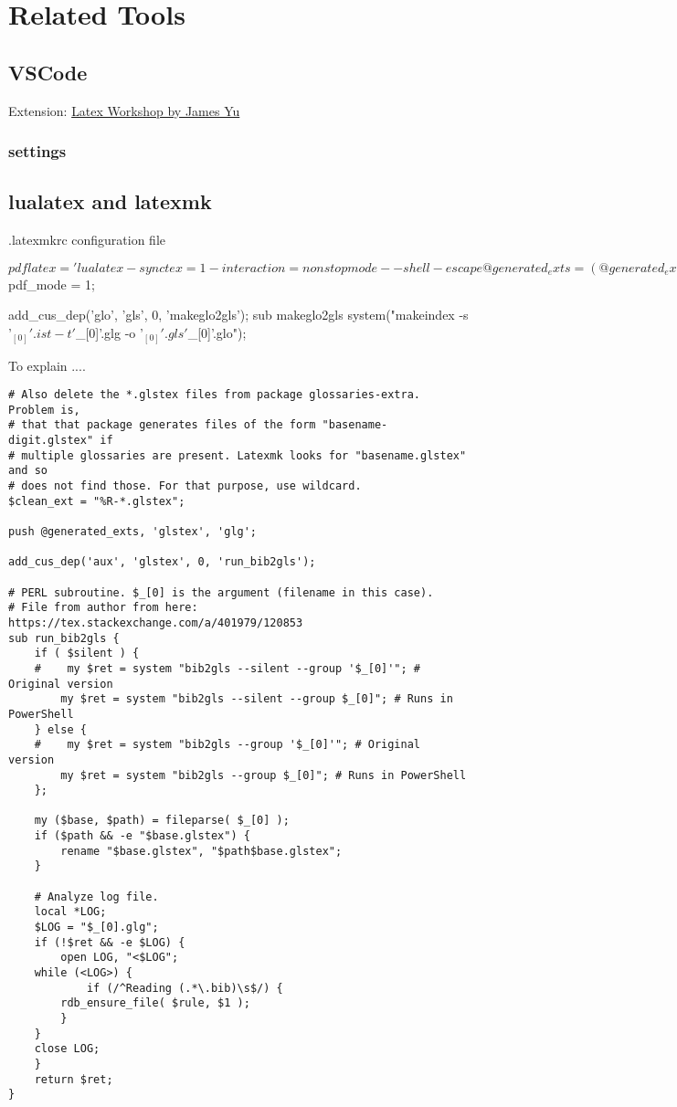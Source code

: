 \section{Related Tools}
\subsection{VSCode}
Extension: \href{https://marketplace.visualstudio.com/items?itemName=James-Yu.latex-workshop}{Latex Workshop by James Yu}

\subsubsection{settings}

\subsection{lualatex and latexmk}
.latexmkrc configuration file
\begin{verbatim*}
	$pdflatex = 'lualatex -synctex=1 -interaction=nonstopmode --shell-escape %O %S';
	@generated_exts = (@generated_exts, 'synctex.gz');
	$pdf_mode = 1;

	add_cus_dep('glo', 'gls', 0, 'makeglo2gls');
	sub makeglo2gls {
		system("makeindex -s '$_[0]'.ist -t '$_[0]'.glg -o '$_[0]'.gls '$_[0]'.glo");
	}
\end{verbatim*}
To explain ....
\begin{verbatim}
# Also delete the *.glstex files from package glossaries-extra. Problem is,
# that that package generates files of the form "basename-digit.glstex" if
# multiple glossaries are present. Latexmk looks for "basename.glstex" and so
# does not find those. For that purpose, use wildcard.
$clean_ext = "%R-*.glstex";

push @generated_exts, 'glstex', 'glg';

add_cus_dep('aux', 'glstex', 0, 'run_bib2gls');

# PERL subroutine. $_[0] is the argument (filename in this case).
# File from author from here: https://tex.stackexchange.com/a/401979/120853
sub run_bib2gls {
    if ( $silent ) {
    #    my $ret = system "bib2gls --silent --group '$_[0]'"; # Original version
        my $ret = system "bib2gls --silent --group $_[0]"; # Runs in PowerShell
    } else {
    #    my $ret = system "bib2gls --group '$_[0]'"; # Original version
        my $ret = system "bib2gls --group $_[0]"; # Runs in PowerShell
    };

    my ($base, $path) = fileparse( $_[0] );
    if ($path && -e "$base.glstex") {
        rename "$base.glstex", "$path$base.glstex";
    }

    # Analyze log file.
    local *LOG;
    $LOG = "$_[0].glg";
    if (!$ret && -e $LOG) {
        open LOG, "<$LOG";
    while (<LOG>) {
            if (/^Reading (.*\.bib)\s$/) {
        rdb_ensure_file( $rule, $1 );
        }
    }
    close LOG;
    }
    return $ret;
}
\end{verbatim}

